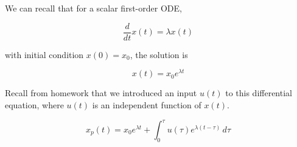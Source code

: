 
We can recall that for a scalar first-order ODE,

\begin{equation}
    \frac{d}{dt} x(t) = \lambda{}x(t) \text{}
\end{equation}

with initial condition $x(0) = x_{0}$,
the solution is

\begin{equation*}
    x(t) = x_{0}e^{\lambda{}t}
\end{equation*}

Recall from homework that we introduced an input $u(t)$ to this differential equation, where $u(t)$ is an independent function of $x(t)$.

\begin{equation}
    x_{p}(t) = x_{0}e^{\lambda{}t} + \int_0^\tau{} \! u(\tau{})e^{\lambda{}(t - \tau{})} \, d\tau{}
\end{equation}

